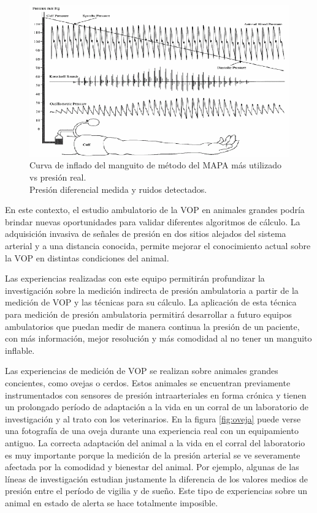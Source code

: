 \begin{figure}[!htbp]
	\centering
	\includegraphics[width=\textwidth]{./Figures/presion.png}
	\caption{Curva de inflado del manguito de método del MAPA más utilizado vs presión real.\\ Presión diferencial medida y ruidos detectados.}
	\label{fig:presion}
\end{figure}

En este contexto, el estudio ambulatorio de la VOP en animales grandes podría brindar nuevas oportunidades para validar diferentes algoritmos de cálculo. La adquisición invasiva de señales de presión en dos sitios alejados del sistema arterial y a una distancia conocida, permite mejorar el conocimiento actual sobre la VOP en distintas condiciones del animal.

Las experiencias realizadas con este equipo permitirán profundizar la investigación sobre la medición indirecta de presión ambulatoria a partir de la medición de VOP y las técnicas para su cálculo. La aplicación de esta técnica para medición de presión ambulatoria permitirá desarrollar a futuro equipos ambulatorios que puedan medir de manera continua la presión de un paciente, con más información, mejor resolución y más comodidad al no tener un manguito inflable.

Las experiencias de medición de VOP se realizan sobre animales grandes concientes, como ovejas o cerdos. Estos animales se encuentran previamente instrumentados con sensores de presión intraarteriales en forma crónica y tienen un prolongado período de adaptación a la vida en un corral de un laboratorio de investigación y al trato con los veterinarios. En la figura \ref{fig:oveja} puede verse una fotografía de una oveja durante una experiencia real con un equipamiento antiguo. La correcta adaptación del animal a la vida en el corral del laboratorio es muy importante porque la medición de la presión arterial se ve severamente afectada por la comodidad y bienestar del animal. Por ejemplo, algunas de las líneas de investigación estudian justamente la diferencia de los valores medios de presión entre el período de vigilia y de sueño. Este tipo de experiencias sobre un animal en estado de alerta se hace totalmente imposible.


